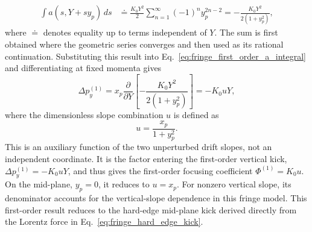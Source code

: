 \begin{align}
 \int a(s,Y+s y_p)\,ds
 &\doteq\frac{K_0Y^2}{2}\sum_{n=1}^{\infty}(-1)^n y_p^{2n-2}
   =-\frac{K_0Y^2}{2(1+y_p^2)},
\end{align}
where $\doteq$ denotes equality up to terms independent of $Y$.
The sum is first obtained where the geometric series converges and then used
as its rational continuation. Substituting this result into
Eq.~\eqref{eq:fringe_first_order_a_integral} and differentiating at fixed
momenta gives
\begin{equation}
 \Delta p_y^{(1)}
 =x_p\frac{\partial}{\partial Y}
   \left[-\frac{K_0Y^2}{2(1+y_p^2)}\right]
 =-K_0uY,
\end{equation}
where the dimensionless slope combination $u$ is defined as
\begin{equation}
 u=\frac{x_p}{1+y_p^2}.
 \label{eq:fringe_u}
\end{equation}
This is an auxiliary function of the two unperturbed drift slopes, not an
independent coordinate. It is the factor entering the first-order vertical
kick, $\Delta p_y^{(1)}=-K_0uY$, and thus gives the first-order focusing
coefficient $\Phi^{(1)}=K_0u$. On the mid-plane, $y_p=0$, it reduces to
$u=x_p$. For nonzero vertical
slope, its denominator accounts for the vertical-slope dependence in this
fringe model. This first-order result reduces to the hard-edge mid-plane
kick derived directly from the Lorentz force in
Eq.~\eqref{eq:fringe_hard_edge_kick}.

